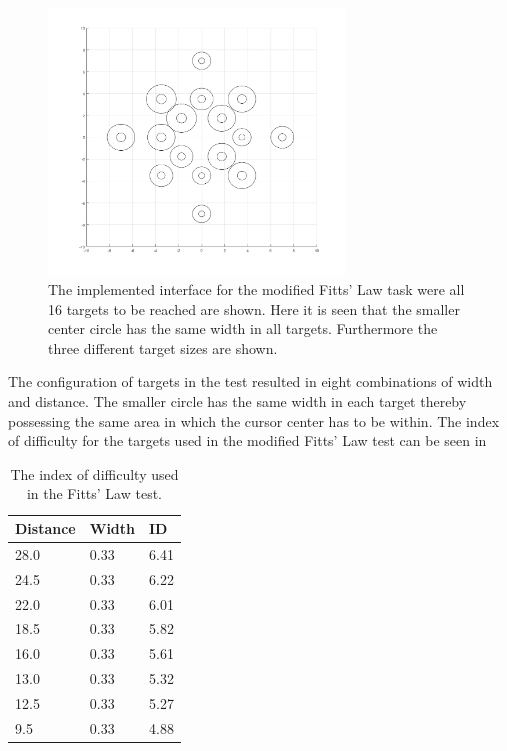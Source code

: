 \begin{figure}[H] 
	\includegraphics[width=0.7\textwidth]{figures/pMethods/DotsToReach}
	\caption{The implemented interface for the modified Fitts' Law task were all 16 targets to be reached are shown. Here it is seen that the smaller center circle has the same width in all targets. Furthermore the three different target sizes are shown.}
	\label{fig:alltargets}
\end{figure}


The configuration of targets in the test resulted in eight combinations of width and distance. The smaller circle has the same width in each target thereby possessing the same area in which the cursor center has to be within. The index of difficulty for the targets used in the modified Fitts' Law test can be seen in 

\begin{table}[H]
	\centering
	\caption{The index of difficulty used in the Fitts' Law test.}
	\label{tab:P:ID}
	\begin{tabular}{lll}
		
		Distance		 & Width	         & ID				   \\ \hline \hline
		28.0     & 0.33 & 6.41                \\ %
		24.5     & 0.33 & 6.22                \\ %
		22.0     & 0.33 & 6.01                \\ %
		18.5     & 0.33 & 5.82                \\ %
		16.0     & 0.33 & 5.61                \\ %
		13.0     & 0.33 & 5.32                \\ %
		12.5     & 0.33 & 5.27                \\ %
		9.5      & 0.33 & 4.88                \\ \hline \hline
	\end{tabular}
\end{table}


